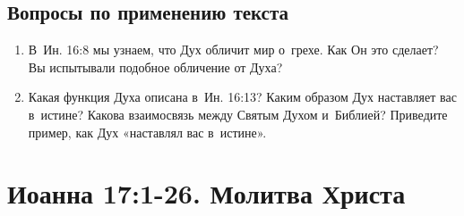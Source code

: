 \documentclass[a4paper,12pt]{article}
\begin{document}
\subsection*{Вопросы по применению текста} 
\begin{enumerate}
    \item В~Ин. 16:8 мы узнаем, что Дух обличит мир о~грехе. Как Он это сделает? Вы испытывали подобное обличение от Духа? 
    
    \myline
    
    \myline
    \item Какая функция Духа описана в~Ин. 16:13? Каким образом Дух наставляет вас в~истине? Какова взаимосвязь между Святым Духом и~Библией? Приведите пример, как Дух «наставлял вас в~истине». 
    
    \myline
    
    \myline
\end{enumerate}



\section{Иоанна 17:1-26. Молитва Христа}
\end{document}
